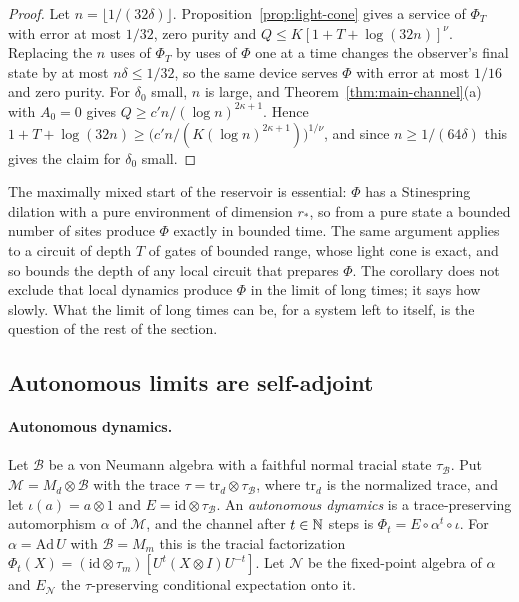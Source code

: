 \begin{proof}
Let $n=\lfloor1/(32\delta)\rfloor$. Proposition~\ref{prop:light-cone} gives a service of $\Phi_T$ with error at most $1/32$, zero purity and
$Q\le K[1+T+\log(32n)]^\nu$. Replacing the $n$ uses of $\Phi_T$ by uses of $\Phi$ one at a time changes the observer's final state by at most
$n\delta\le1/32$, so the same device serves $\Phi$ with error at most $1/16$ and zero purity. For $\delta_0$ small, $n$ is large, and
Theorem~\ref{thm:main-channel}(a) with $A_0=0$ gives $Q\ge c'n/(\log n)^{2\kappa+1}$. Hence
$1+T+\log(32n)\ge\bigl(c'n/(K(\log n)^{2\kappa+1})\bigr)^{1/\nu}$, and since $n\ge1/(64\delta)$ this gives the claim for $\delta_0$ small.
\end{proof}

The maximally mixed start of the reservoir is essential: $\Phi$ has a Stinespring dilation with a pure environment of dimension $r_*$, so
from a pure state a bounded number of sites produce $\Phi$ exactly in bounded time. The same argument applies to a circuit of depth $T$ of
gates of bounded range, whose light cone is exact, and so bounds the depth of any local circuit that prepares $\Phi$. The corollary does not
exclude that local dynamics produce $\Phi$ in the limit of long times; it says how slowly. What the limit of long times can be, for a system
left to itself, is the question of the rest of the section.

\subsection{Autonomous limits are self-adjoint}\label{sec:physics-autonomous}

\paragraph{Autonomous dynamics.} Let $\mathcal B$ be a von Neumann algebra with a faithful normal tracial state $\tau_{\mathcal B}$. Put
$\mathcal M=M_d\otimes\mathcal B$ with the trace $\tau=\mathrm{tr}_d\otimes\tau_{\mathcal B}$, where $\mathrm{tr}_d$ is the normalized trace, and let
$\iota(a)=a\otimes1$ and $E=\mathrm{id}\otimes\tau_{\mathcal B}$. An \emph{autonomous dynamics} is a trace-preserving automorphism $\alpha$ of
$\mathcal M$, and the channel after $t\in\mathbb N$ steps is $\Phi_t=E\circ\alpha^t\circ\iota$. For $\alpha=\mathrm{Ad}\,U$ with $\mathcal B=M_m$ this is
the tracial factorization $\Phi_t(X)=(\mathrm{id}\otimes\tau_m)[U^t(X\otimes I)U^{-t}]$. Let $\mathcal N$ be the fixed-point algebra of $\alpha$
and $E_{\mathcal N}$ the $\tau$-preserving conditional expectation onto it.

